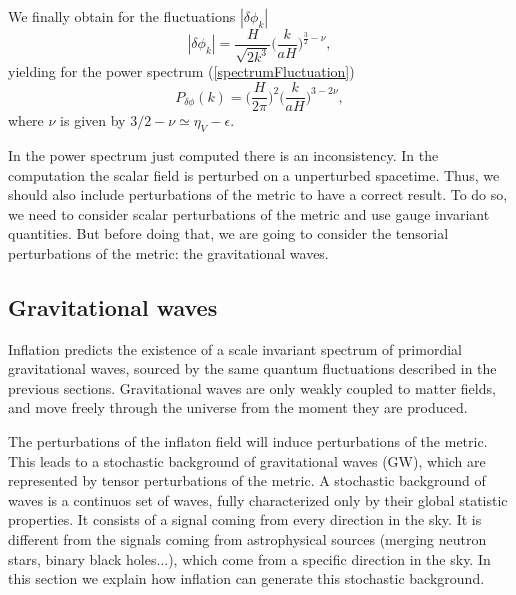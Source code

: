 \documentclass[11pt,a4paper,twoside]{book}
\begin{document}
We finally obtain for the fluctuations $ |\delta \phi_{k}| $ 
\begin{equation}
	\label{solutionDeltaPhi}
	|\delta \phi_{k}|= \frac{H}{\sqrt{2 k^{3}}}\Big (\frac{k}{aH}\Big)^{\frac{3}{2}-\nu},
\end{equation}
yielding for the power spectrum (\ref{spectrumFluctuation})
\begin{equation}
	\label{PowerSpectrumperturbation}
	P_{\delta \phi}(k) = \Big (\frac{H}{2\pi}\Big)^{2}\Big (\frac{k}{aH}\Big)^{3-2\nu},
\end{equation}
where $ \nu $ is given by $ 3/2 - \nu \simeq \eta_{V} - \epsilon$.

In the power spectrum just computed there is an inconsistency. In the computation the scalar field is perturbed on a unperturbed spacetime. Thus, we should also include perturbations of the metric to have a correct result. To do so, we need to consider scalar perturbations of the metric and use gauge invariant quantities. But before doing that, we are going to consider the tensorial perturbations of the metric: the gravitational waves.

\subsection{Gravitational waves}
Inflation predicts the existence of a scale invariant spectrum of primordial gravitational waves, sourced by the same quantum fluctuations described in the previous sections. Gravitational waves are only weakly coupled to matter fields, and move freely through the universe from the moment they are produced.

The perturbations of the inflaton field will induce perturbations of the metric. This leads to a stochastic background of gravitational waves (GW),  which are represented by tensor perturbations of the metric.
A stochastic background of waves is a continuos set of waves, fully characterized  only by their global statistic properties. It consists of a signal coming from every direction in the sky. It is different from the signals coming from astrophysical sources (merging neutron stars,  binary black holes...), which come from a specific direction in the sky. 
In this section we explain how inflation can generate this stochastic background. 
\end{document}
